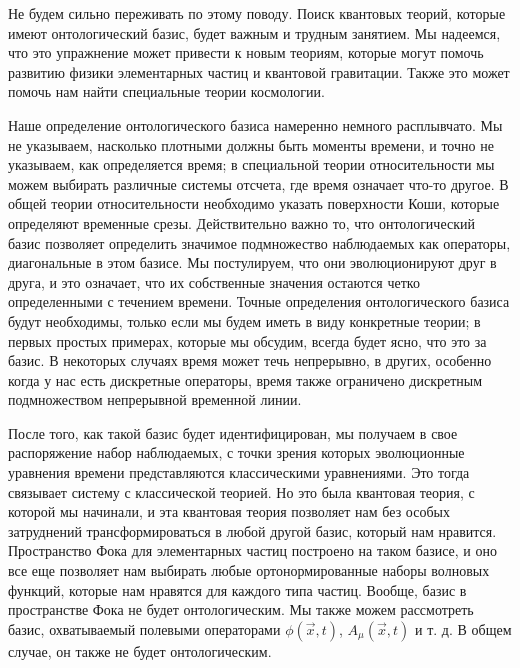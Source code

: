 \documentclass[main.tex]{subfiles}
\begin{document}
Не будем сильно переживать по этому поводу. Поиск квантовых теорий, которые имеют онтологический базис, будет важным и трудным занятием. Мы надеемся, что это упражнение может привести к новым теориям, которые могут помочь развитию физики элементарных частиц и квантовой гравитации. Также это может помочь нам найти специальные теории космологии.

Наше определение онтологического базиса намеренно немного расплывчато. Мы не указываем, насколько плотными должны быть моменты времени, и точно не указываем, как определяется время; в специальной теории относительности мы можем выбирать различные системы отсчета, где время означает что-то другое. В общей теории относительности необходимо указать поверхности Коши, которые определяют временные срезы. Действительно важно то, что онтологический базис позволяет определить значимое подмножество наблюдаемых как операторы, диагональные в этом базисе. Мы постулируем, что они эволюционируют друг в друга, и это означает, что их собственные значения остаются четко определенными с течением времени. Точные определения онтологического базиса будут необходимы, только если мы будем иметь в виду конкретные теории; в первых простых примерах, которые мы обсудим, всегда будет ясно, что это за базис. В некоторых случаях время может течь непрерывно, в других, особенно когда у нас есть дискретные операторы, время также ограничено дискретным подмножеством непрерывной временной линии.

После того, как такой базис будет идентифицирован, мы получаем в свое распоряжение набор наблюдаемых, с точки зрения которых эволюционные уравнения времени представляются классическими уравнениями. Это тогда связывает систему с классической теорией. Но это была квантовая теория, с которой мы начинали, и эта квантовая теория позволяет нам без особых затруднений трансформироваться в любой другой базис, который нам нравится. Пространство Фока для элементарных частиц построено на таком базисе, и оно все еще позволяет нам выбирать любые ортонормированные наборы волновых функций, которые нам нравятся для каждого типа частиц. Вообще, базис в пространстве Фока не будет онтологическим. Мы также можем рассмотреть базис, охватываемый полевыми операторами $\phi(\vec x, t)$, $A_\mu(\vec x, t)$ и т. д. В общем случае, он также не будет онтологическим.
\end{document}
